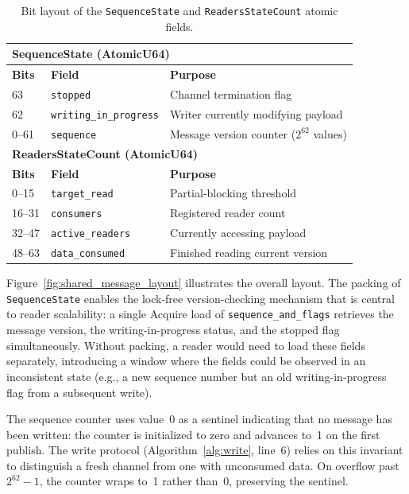 \begin{table}[htbp]
    \centering
    \caption{Bit layout of the \texttt{SequenceState} and \texttt{ReadersStateCount} atomic fields.}
    \label{tab:bit_layout}
    \begin{tabular}{lll}
        \toprule
        \multicolumn{3}{l}{\textbf{SequenceState (AtomicU64)}} \\
        \midrule
        \textbf{Bits} & \textbf{Field} & \textbf{Purpose} \\
        \midrule
        63 & \texttt{stopped} & Channel termination flag \\
        62 & \texttt{writing\_in\_progress} & Writer currently modifying payload \\
        0--61 & \texttt{sequence} & Message version counter ($2^{62}$ values) \\
        \midrule
        \multicolumn{3}{l}{\textbf{ReadersStateCount (AtomicU64)}} \\
        \midrule
        \textbf{Bits} & \textbf{Field} & \textbf{Purpose} \\
        \midrule
        0--15 & \texttt{target\_read} & Partial-blocking threshold \\
        16--31 & \texttt{consumers} & Registered reader count \\
        32--47 & \texttt{active\_readers} & Currently accessing payload \\
        48--63 & \texttt{data\_consumed} & Finished reading current version \\
        \bottomrule
    \end{tabular}
\end{table}

Figure~\ref{fig:shared_message_layout} illustrates the overall layout. The packing of \texttt{SequenceState} enables the lock-free version-checking mechanism that is central to reader scalability: a single Acquire load of \texttt{sequence\_\-and\_\-flags} retrieves the message version, the writing-in-progress status, and the stopped flag simultaneously. Without packing, a reader would need to load these fields separately, introducing a window where the fields could be observed in an inconsistent state (e.g., a new sequence number but an old writing-in-progress flag from a subsequent write).

The sequence counter uses value~0 as a sentinel indicating that no message has been written: the counter is initialized to zero and advances to~1 on the first publish. The write protocol (Algorithm~\ref{alg:write}, line~6) relies on this invariant to distinguish a fresh channel from one with unconsumed data. On overflow past $2^{62} - 1$, the counter wraps to~1 rather than~0, preserving the sentinel.

